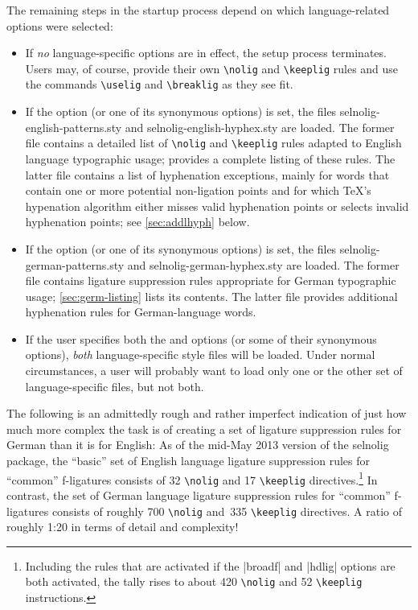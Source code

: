 \documentclass[11pt]{article}
\newcommand{\pkg}[1]{\textsf{#1}}
\newcommand{\opt}[1]{\uselig{\texttt{#1}}}
\newcommand{\cmmd}[1]{\texttt{\textbackslash #1}}
\begin{document}
The remaining steps in the startup process depend on which language-related options were selected:
\begin{itemize}
\item If \emph{no} language-specific options are in effect, the setup process terminates. Users may, of course, provide their own \cmmd{nolig} and \cmmd{keeplig} rules and use the commands \cmmd{uselig} and \cmmd{breaklig} as they see fit.

\item If the \opt{english} option (or one of its synonymous options) is set, the files \pkg{selnolig-english-patterns.sty} and \pkg{selnolig-english-hyphex.sty} are loaded. The former file contains a detailed list of \cmmd{nolig} and \cmmd{keeplig} rules adapted to English language typographic usage;  provides a complete listing of these rules. The latter file contains a list of hyphenation exceptions, mainly for words that contain one or more potential non-ligation points and for which \TeX's hypenation algorithm either misses valid hyphenation points or selects invalid hyphenation points; see \cref{sec:addlhyph} below.

\item If the \opt{ngerman} option (or one of its synonymous options) is set, the files \pkg{selnolig-german-patterns.sty} and \pkg{selnolig-german-hyphex.sty} are loaded. The former file contains ligature suppression rules appropriate for German typographic usage; \cref{sec:germ-listing} lists its contents. The latter file provides additional hyphenation rules for German-language words.

\item If the user specifies both the \opt{english} and \opt{ngerman} options (or some of their synonymous options), \emph{both} language-specific style files will be loaded. Under normal circumstances, a user will probably want to load only one or the other set of language-specific files, but not both.
\end{itemize}

The following is an admittedly rough and rather imperfect indication of just how much more complex the task is of creating a set of ligature suppression rules for German than it is for English: As of the mid-May 2013 version of the \pkg{selnolig} package, the \enquote{basic} set of English language ligature suppression rules for \enquote{common} f-ligatures consists of 32 \cmmd{nolig} and 17 \cmmd{keeplig} directives.\footnote{Including the rules that are activated if the |broadf| and |hdlig| options are both activated, the tally rises to about 420 \cmmd{nolig} and 52 \cmmd{keeplig} instructions.} In contrast, the set of German language ligature suppression rules for \enquote{common} f-ligatures consists of roughly 700 \cmmd{nolig} and~335 \cmmd{keeplig} directives. A ratio of roughly 1:20 in terms of detail and complexity!
\end{document}
